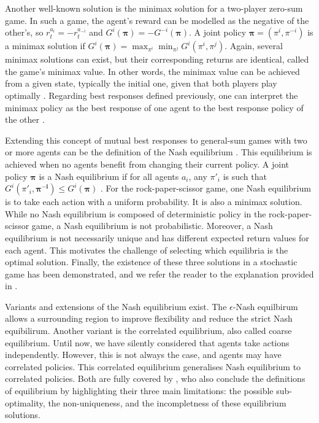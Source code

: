 Another well-known solution is the minimax solution for a two-player zero-sum game.
In such a game, the agent's reward can be modelled as the negative of the other's, so $r_t^{a_i} = -r_t^{a_{-i}}$ and $G^i(\mathbf{\pi}) = - G^{-i}(\mathbf{\pi})$.
A joint policy $\mathbf{\pi} = (\pi^i, \pi^{-i})$ is a minimax solution if $G^i(\mathbf{\pi})=\max_{\pi^i} \min_{\pi^j} G^i(\pi^i, \pi^j)$.
Again, several minimax solutions can exist, but their corresponding returns are identical, called the game's minimax value.
In other words, the minimax value can be achieved from a given state, typically the initial one, given that both players play optimally \citep{russel2010}.
Regarding best responses defined previously, one can interpret the minimax policy as the best response of one agent to the best response policy of the other \citep{marl-book}.

Extending this concept of mutual best responses to general-sum games with two or more agents can be the definition of the Nash equilibrium \citep{marl-book}.
This equilibrium is achieved when no agents benefit from changing their current policy.
A joint policy $\mathbf{\pi}$ is a Nash equilibrium if for all agents $a_i$, any $\pi'_i$ is such that $G^i(\pi'_i , \mathbf{\pi^{-i}}) \le G^i(\mathbf{\pi})$ \citep{nash1950equilibrium}.
For the rock-paper-scissor game, one Nash equilibrium is to take each action with a uniform probability.
It is also a minimax solution.
While no Nash equilibrium is composed of deterministic policy in the rock-paper-scissor game, a Nash equilibrium is not probabilistic.
Moreover, a Nash equilibrium is not necessarily unique and has different expected return values for each agent.
This motivates the challenge of selecting which equilibria is the optimal solution.
Finally, the existence of these three solutions in a stochastic game has been demonstrated, and we refer the reader to the explanation provided in \citep{marl-book}.

Variants and extensions of the Nash equilibrium exist.
The $\epsilon$-Nash equilbirum allows a surrounding region to improve flexibility and reduce the strict Nash equibilirum.
Another variant is the correlated equilibrium, also called coarse equilibrium.
Until now, we have silently considered that agents take actions independently.
However, this is not always the case, and agents may have correlated policies.
This correlated equilibrium generalises Nash equilibrium to correlated policies.
Both are fully covered by \cite{marl-book}, who also conclude the definitions of equilibrium by highlighting their three main limitations: the possible sub-optimality, the non-uniqueness, and the incompletness of these equilibrium solutions.

